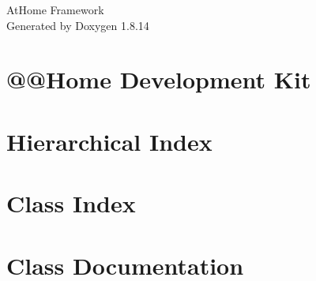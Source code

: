 \documentclass[twoside]{book}
\newcommand{\+}{\discretionary{\mbox{\scriptsize$\hookleftarrow$}}{}{}}
\newcommand{\clearemptydoublepage}{%
  \newpage{\pagestyle{empty}\cleardoublepage}%
}
\begin{document}
\hypersetup{pageanchor=false,
             bookmarksnumbered=true,
             pdfencoding=unicode
            }
\begin{titlepage}
\vspace*{7cm}
\begin{center}%
{\Large At\+Home Framework }\\
\vspace*{1cm}
{\large Generated by Doxygen 1.8.14}\\
\end{center}
\end{titlepage}
\clearemptydoublepage
{}
\tableofcontents
\clearemptydoublepage
{}
\hypersetup{pageanchor=true}

\chapter{@@Home Development Kit}
\label{index}\hypertarget{index}{}
\chapter{Hierarchical Index}

\chapter{Class Index}

\chapter{Class Documentation}






























\backmatter
\newpage
{}
\clearemptydoublepage
{}
\printindex
\end{document}

